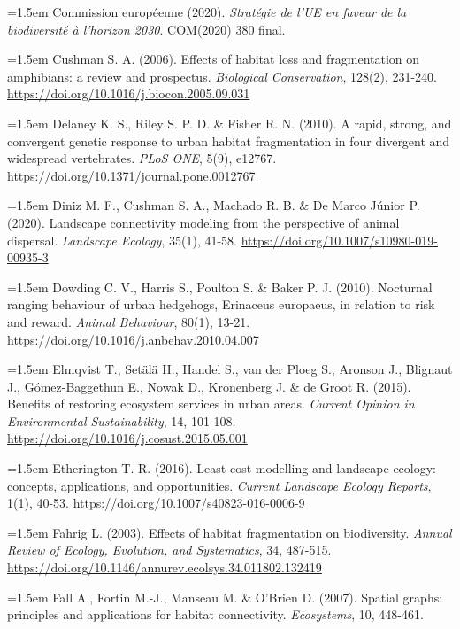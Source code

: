 \documentclass[a4paper,12pt]{report}
\begin{document}
\noindent\hangindent=1.5em Commission européenne (2020). \textit{Stratégie de l'UE en faveur de la biodiversité à l'horizon 2030}. COM(2020) 380 final.\par\medskip
\noindent\hangindent=1.5em Cushman S. A. (2006). Effects of habitat loss and fragmentation on amphibians: a review and prospectus. \textit{Biological Conservation}, 128(2), 231-240. \url{https://doi.org/10.1016/j.biocon.2005.09.031}\par\medskip
\noindent\hangindent=1.5em Delaney K. S., Riley S. P. D. \& Fisher R. N. (2010). A rapid, strong, and convergent genetic response to urban habitat fragmentation in four divergent and widespread vertebrates. \textit{PLoS ONE}, 5(9), e12767. \url{https://doi.org/10.1371/journal.pone.0012767}\par\medskip
\noindent\hangindent=1.5em Diniz M. F., Cushman S. A., Machado R. B. \& De Marco Júnior P. (2020). Landscape connectivity modeling from the perspective of animal dispersal. \textit{Landscape Ecology}, 35(1), 41-58. \url{https://doi.org/10.1007/s10980-019-00935-3}\par\medskip
\noindent\hangindent=1.5em Dowding C. V., Harris S., Poulton S. \& Baker P. J. (2010). Nocturnal ranging behaviour of urban hedgehogs, Erinaceus europaeus, in relation to risk and reward. \textit{Animal Behaviour}, 80(1), 13-21. \url{https://doi.org/10.1016/j.anbehav.2010.04.007}\par\medskip
\noindent\hangindent=1.5em Elmqvist T., Setälä H., Handel S., van der Ploeg S., Aronson J., Blignaut J., Gómez-Baggethun E., Nowak D., Kronenberg J. \& de Groot R. (2015). Benefits of restoring ecosystem services in urban areas. \textit{Current Opinion in Environmental Sustainability}, 14, 101-108. \url{https://doi.org/10.1016/j.cosust.2015.05.001}\par\medskip
\noindent\hangindent=1.5em Etherington T. R. (2016). Least-cost modelling and landscape ecology: concepts, applications, and opportunities. \textit{Current Landscape Ecology Reports}, 1(1), 40-53. \url{https://doi.org/10.1007/s40823-016-0006-9}\par\medskip
\noindent\hangindent=1.5em Fahrig L. (2003). Effects of habitat fragmentation on biodiversity. \textit{Annual Review of Ecology, Evolution, and Systematics}, 34, 487-515. \url{https://doi.org/10.1146/annurev.ecolsys.34.011802.132419}\par\medskip
\noindent\hangindent=1.5em Fall A., Fortin M.-J., Manseau M. \& O'Brien D. (2007). Spatial graphs: principles and applications for habitat connectivity. \textit{Ecosystems}, 10, 448-461.\par\medskip
\end{document}
